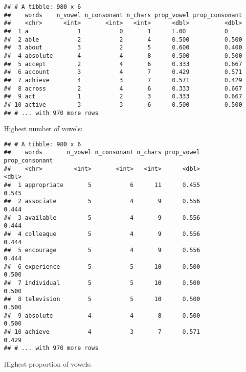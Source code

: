 \documentclass[]{article}
\newenvironment{Shaded}{\begin{snugshade}}{\end{snugshade}}
\newcommand{\KeywordTok}[1]{\textcolor[rgb]{0.13,0.29,0.53}{\textbf{#1}}}
\newcommand{\StringTok}[1]{\textcolor[rgb]{0.31,0.60,0.02}{#1}}
\newcommand{\OperatorTok}[1]{\textcolor[rgb]{0.81,0.36,0.00}{\textbf{#1}}}
\newcommand{\NormalTok}[1]{#1}
\theoremstyle{definition}
\theoremstyle{definition}
\theoremstyle{definition}
\theoremstyle{remark}
\begin{document}
\begin{verbatim}
## # A tibble: 980 x 6
##    words    n_vowel n_consonant n_chars prop_vowel prop_consonant
##    <chr>      <int>       <int>   <int>      <dbl>          <dbl>
##  1 a              1           0       1      1.00           0    
##  2 able           2           2       4      0.500          0.500
##  3 about          3           2       5      0.600          0.400
##  4 absolute       4           4       8      0.500          0.500
##  5 accept         2           4       6      0.333          0.667
##  6 account        3           4       7      0.429          0.571
##  7 achieve        4           3       7      0.571          0.429
##  8 across         2           4       6      0.333          0.667
##  9 act            1           2       3      0.333          0.667
## 10 active         3           3       6      0.500          0.500
## # ... with 970 more rows
\end{verbatim}

Highest number of vowels:

\begin{Shaded}
\end{Shaded}

\begin{verbatim}
## # A tibble: 980 x 6
##    words       n_vowel n_consonant n_chars prop_vowel prop_consonant
##    <chr>         <int>       <int>   <int>      <dbl>          <dbl>
##  1 appropriate       5           6      11      0.455          0.545
##  2 associate         5           4       9      0.556          0.444
##  3 available         5           4       9      0.556          0.444
##  4 colleague         5           4       9      0.556          0.444
##  5 encourage         5           4       9      0.556          0.444
##  6 experience        5           5      10      0.500          0.500
##  7 individual        5           5      10      0.500          0.500
##  8 television        5           5      10      0.500          0.500
##  9 absolute          4           4       8      0.500          0.500
## 10 achieve           4           3       7      0.571          0.429
## # ... with 970 more rows
\end{verbatim}

Highest proportion of vowels:
\end{document}
